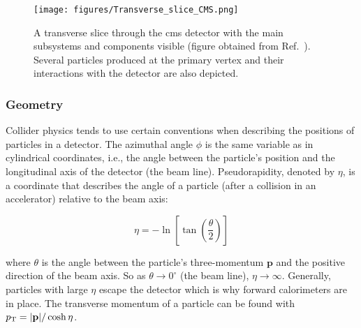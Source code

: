 \begin{figure}[htbp]
    \centering
    \texttt{[image: figures/Transverse\_slice\_CMS.png]}
    \caption[A transverse slice through the CMS detector with the main subsystems and components visible]{A transverse slice through the \acrshort{cms} detector with the main subsystems and components visible (figure obtained from Ref.~). Several particles produced at the primary vertex and their interactions with the detector are also depicted.}
    \label{fig:detector_cms_transverse}
\end{figure}





\subsubsection{Geometry}
\label{subsubsec:geometry}

Collider physics tends to use certain conventions when describing the positions of particles in a detector. The azimuthal angle $\phi$ is the same variable as in cylindrical coordinates, i.e., the angle between the particle's position and the longitudinal axis of the detector (the beam line). Pseudorapidity, denoted by $\eta$, is a coordinate that describes the angle of a particle (after a collision in an accelerator) relative to the beam axis:

\begin{equation}
    \eta = -\ln \left[ \tan \left( \frac{\theta}{2} \right) \right]
    \label{eq:eta_def}
\end{equation}

where $\theta$ is the angle between the particle's three-momentum $\mathbf{p}$ and the positive direction of the beam axis. So as $\theta \rightarrow 0^{\circ}$ (the beam line), $\eta \rightarrow \infty$. Generally, particles with large $\eta$ escape the detector which is why forward calorimeters are in place. The transverse momentum of a particle can be found with $p_{\mathrm{T}} = \lvert \mathbf{p} \rvert / \cosh \eta$.

